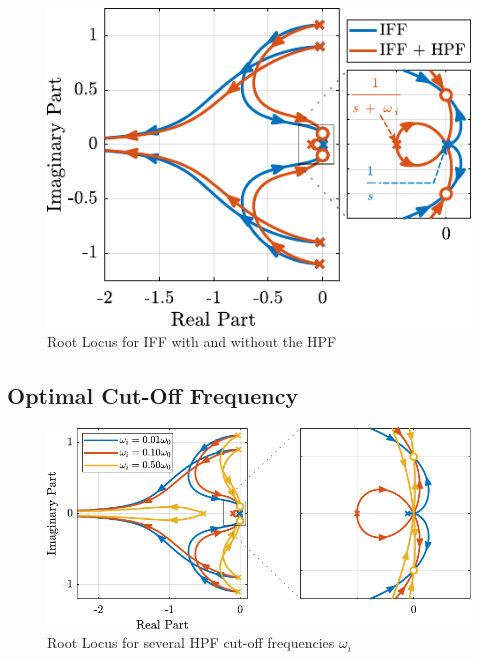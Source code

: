 \documentclass{ISMA_USD2020}
\begin{document}
\begin{figure}[htbp]
\centering
\includegraphics[scale=1]{figs/root_locus_modified_iff.pdf}
\caption{\label{fig:root_locus_modified_iff}Root Locus for IFF with and without the HPF}
\end{figure}

\subsection{Optimal Cut-Off Frequency}
\label{sec:org6ba4e55}

\begin{figure}[htbp]
\centering
\includegraphics[scale=1]{figs/root_locus_wi_modified_iff.pdf}
\caption{\label{fig:root_locus_wi_modified_iff}Root Locus for several HPF cut-off frequencies \(\omega_i\)}
\end{figure}
\end{document}
